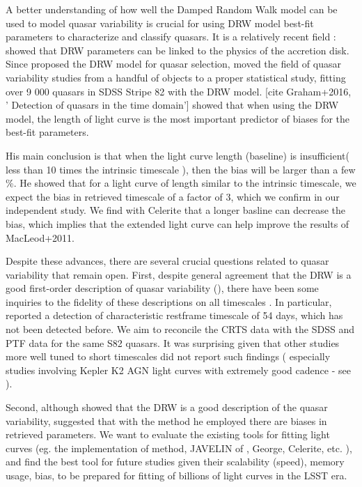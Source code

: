 \documentclass[modern]{aastex62}
\begin{document}
 
A better understanding of how well the Damped Random Walk model can be used to model quasar variability is crucial for using DRW model best-fit parameters to characterize and classify quasars. It is a relatively recent field : \cite{kelly2009} showed that DRW parameters can be linked to the physics of the accretion disk. Since \cite{kozlowski2010} proposed the DRW model for quasar selection, \cite{macleod2010} moved the field of quasar variability studies from a handful of objects to a proper statistical study, fitting over 9 000 quasars in SDSS Stripe 82 with the DRW model. [cite Graham+2016, '
Detection of quasars in the time domain'] \cite{kozlowski2017a} showed that when using the  DRW model, the length of light curve is the most important predictor of biases for the best-fit parameters. 

His main conclusion is that when the light curve length (baseline) is insufficient( less than 10 times the intrinsic timescale ), then the bias will be larger than a few \%. He showed that for a light curve of length similar to the intrinsic timescale, we expect the bias in retrieved timescale of a factor of 3, which we confirm in our independent study.  We find with Celerite that a longer basline can decrease the bias, which implies that the extended light curve can help improve the results of MacLeod+2011.  

Despite these advances, there are several crucial questions related to quasar variability that remain open. First, despite general agreement that the DRW is a good first-order description of quasar variability (\cite{zu2011,kozlowski2010}), there have been some inquiries to the fidelity of these descriptions on all timescales \cite{zu2013, kasliwal2017, sartori2018}. In particular, \cite{graham2014} reported  a detection of characteristic restframe timescale of 54 days, which has not been detected before.  We  aim to reconcile the CRTS data with the SDSS and PTF data for the same S82 quasars. It was surprising given that other studies more well tuned to short timescales did not report such findings ( especially studies involving Kepler K2  AGN light curves with extremely good cadence - see \cite{kasliwal2015a, aranzana2018, smith2018}).

Second, although \cite{kelly2011} showed that the DRW is a good description of the quasar variability, \cite{kozlowski2017a} suggested that with the method he employed there are biases in retrieved parameters. We want to evaluate the existing tools for fitting light curves (eg. the implementation of \cite{rybicki1995} method, JAVELIN of \cite{zu2011}, George, Celerite, etc. ), and find the best tool for future studies given their scalability (speed), memory usage, bias, to be prepared for fitting of billions of light curves in the LSST era. 
\end{document}
